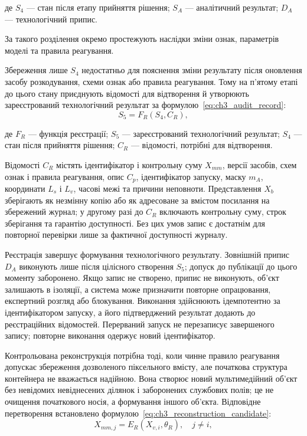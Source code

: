 де $S_4$ --- стан після етапу прийняття рішення; $S_A$ --- аналітичний результат; $D_A$ --- технологічний припис.

За такого розділення окремо простежують наслідки зміни ознак, параметрів моделі та правила реагування.

Збереження лише $S_4$ недостатньо для пояснення зміни результату після оновлення засобу розкодування, схеми ознак або правила реагування. Тому на п’ятому етапі до цього стану приєднують відомості для відтворення й утворюють зареєстрований технологічний результат за формулою~\eqref{eq:ch3_audit_record}:
\begin{equation}
S_5=F_R(S_4,C_R),
\label{eq:ch3_audit_record}
\end{equation}

де $F_R$ --- функція реєстрації; $S_5$ --- зареєстрований технологічний результат; $S_4$ --- стан після прийняття рішення; $C_R$ --- відомості, потрібні для відтворення.

Відомості $C_R$ містять ідентифікатор і контрольну суму $X_{mm}$, версії засобів, схем ознак і правила реагування, опис $C_p$, ідентифікатор запуску, маску $m_A$, координати $L_s$ і $L_v$, часові межі та причини неповноти. Представлення $X_b$ зберігають як незмінну копію або як адресоване за вмістом посилання на збережений журнал; у другому разі до $C_R$ включають контрольну суму, строк зберігання та гарантію доступності. Без цих умов запис є достатнім для повторної перевірки лише за фактичної доступності журналу.

Реєстрація завершує формування технологічного результату. Зовнішній припис $D_A$ виконують лише після цілісного створення $S_5$; допуск до публікації до цього моменту заборонено. Якщо запис не створено, припис не виконують, об’єкт залишають в ізоляції, а система може призначити повторне опрацювання, експертний розгляд або блокування. Виконання здійснюють ідемпотентно за ідентифікатором запуску, а його підтверджений результат додають до реєстраційних відомостей. Перерваний запуск не перезаписує завершеного запису; повторне виконання одержує новий ідентифікатор.

Контрольована реконструкція потрібна тоді, коли чинне правило реагування допускає збереження дозволеного піксельного вмісту, але початкова структура контейнера не вважається надійною. Вона створює новий мультимедійний об’єкт без невідомих невіднесених ділянок і заборонених службових полів; це не очищення початкового носія, а формування іншого об’єкта. Відповідне перетворення встановлено формулою~\eqref{eq:ch3_reconstruction_candidate}:
\begin{equation}
X_{mm,j}=E_R(X_{v,i},\theta_R),\quad j\neq i,
\label{eq:ch3_reconstruction_candidate}
\end{equation}

